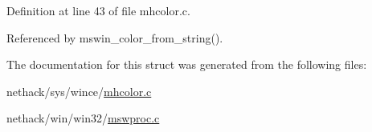 Definition at line 43 of file mhcolor.\+c.



Referenced by mswin\+\_\+color\+\_\+from\+\_\+string().



The documentation for this struct was generated from the following files\+:\begin{DoxyCompactItemize}
\item 
nethack/sys/wince/\hyperlink{mhcolor_8c}{mhcolor.\+c}\item 
nethack/win/win32/\hyperlink{win_2win32_2mswproc_8c}{mswproc.\+c}\end{DoxyCompactItemize}
